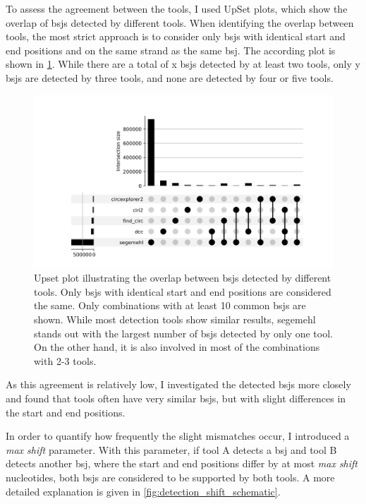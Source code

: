 To assess the agreement between the tools, I used UpSet plots, which show the
overlap of \glspl{bsj} detected by different tools.
When identifying the overlap between tools, the most strict approach is to
consider only \glspl{bsj} with identical start and end positions and on the same
strand as the same \gls{bsj}.
The according plot is shown in \cref{fig:detection_upset_0}.
While there are a total of x \glspl{bsj} detected by at least two tools, only y
\glspl{bsj} are detected by three tools, and none are detected by four or five
tools.

\begin{figure}[H]
    \centering

    \includegraphics[width=\textwidth]{chapters/4_results_and_discussion/figures/detection/upset/shift_0.png}
    \caption{Upset plot illustrating the overlap between \glspl{bsj} detected by
        different tools.
        Only \glspl{bsj} with identical start and end positions are considered the same.
        Only combinations with at least 10 common \glspl{bsj} are shown.
        While most detection tools show similar results, segemehl stands out with the
        largest number of \glspl{bsj} detected by only one tool.
        On the other hand, it is also involved in most of the combinations with 2-3
        tools.
    } \label{fig:detection_upset_0} \end{figure}

As this agreement is relatively low, I investigated the detected \glspl{bsj}
more closely and found that tools often have very similar \glspl{bsj}, but with
slight differences in the start and end positions.

In order to quantify how frequently the slight mismatches occur, I introduced a
\textit{max shift} parameter.
With this parameter, if tool A detects a \gls{bsj} and tool B detects another
\gls{bsj}, where the start and end positions differ by at most \textit{max
    shift} nucleotides, both \glspl{bsj} are considered to be supported by both
tools.
A more detailed explanation is given in \cref{fig:detection_shift_schematic}.

